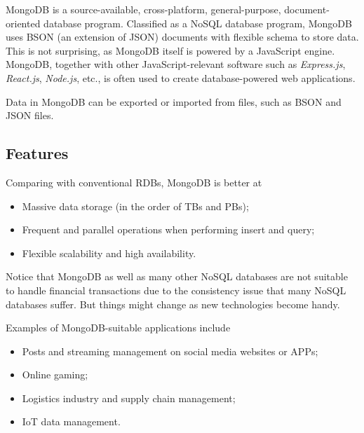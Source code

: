 MongoDB is a source-available, cross-platform, general-purpose, document-oriented database program. Classified as a NoSQL database program, MongoDB uses BSON (an extension of JSON) documents with flexible schema to store data. This is not surprising, as MongoDB itself is powered by a JavaScript engine. MongoDB, together with other JavaScript-relevant software such as \textit{Express.js}, \textit{React.js}, \textit{Node.js}, etc., is often used to create database-powered web applications.

Data in MongoDB can be exported or imported from files, such as BSON and JSON files.

\subsection{Features}

Comparing with conventional RDBs, MongoDB is better at
\begin{itemize}
	\item Massive data storage (in the order of TBs and PBs);
	\item Frequent and parallel operations when performing insert and query;
	\item Flexible scalability and high availability.
\end{itemize}
Notice that MongoDB as well as many other NoSQL databases are not suitable to handle financial transactions due to the consistency issue that many NoSQL databases suffer. But things might change as new technologies become handy.

Examples of MongoDB-suitable applications include
\begin{itemize}
	\item Posts and streaming management on social media websites or APPs;
	\item Online gaming;
	\item Logistics industry and supply chain management;
	\item IoT data management.
\end{itemize}

